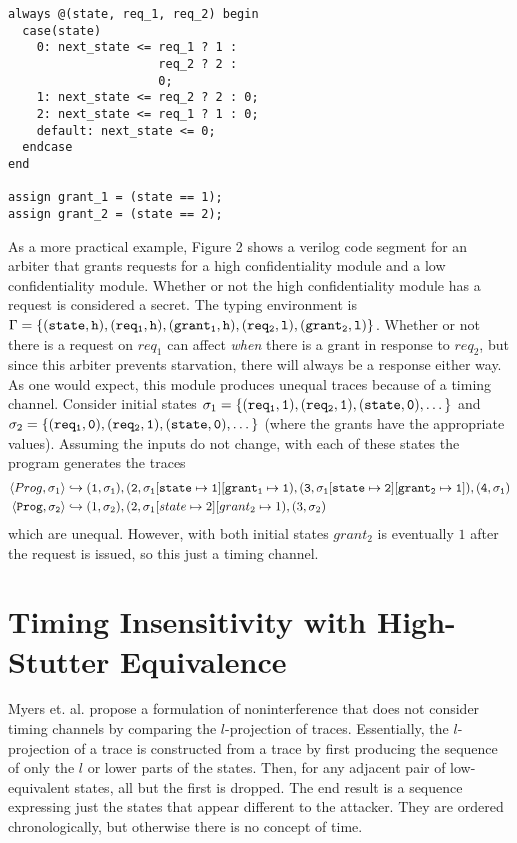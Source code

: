 \documentclass[paper=a4, fontsize=10pt]{scrartcl} %
\begin{document}
\begin{lstlisting}[frame=single,caption=An Arbiter in Verilog.]
always @(state, req_1, req_2) begin
  case(state)
    0: next_state <= req_1 ? 1 :
                     req_2 ? 2 :
                     0;
    1: next_state <= req_2 ? 2 : 0;
    2: next_state <= req_1 ? 1 : 0;
    default: next_state <= 0;
  endcase
end

assign grant_1 = (state == 1);
assign grant_2 = (state == 2);
\end{lstlisting}

As a more practical example, Figure 2 shows a verilog code segment for an 
arbiter that grants requests for a high confidentiality module and a low 
confidentiality module. Whether or not the high confidentiality module has a 
request is considered a secret.
The typing environment is
$\Gamma = \tt{\{(state, h), (req_1, h), (grant_1, h), (req_2, l), (grant_2, l)\}}$.
Whether or not there is a request on $req_1$ can affect \emph{when} there is a 
grant in response to $req_2$, but since this arbiter prevents starvation, there 
will always be a response either way. As one would expect, this module produces 
unequal traces because of a timing channel. Consider initial states
$\sigma_1 = \{(\tt{req_1}, 1), (\tt{req_2}, 1), (\tt{state}, 0), \dots\}$ and
$\sigma_2 = \{(\tt{req_1}, 0), (\tt{req_2}, 1), (\tt{state}, 0), \dots\}$ (where the grants 
have the appropriate values). Assuming the inputs 
do not change, with each of these states the program generates the traces
\begin{align*}
  \langle Prog, \sigma_1 \rangle & \hookrightarrow
  \tt
    (1, \sigma_1), (2, \sigma_1[state\mapsto1][grant_1\mapsto1),
    (3, \sigma_1[state\mapsto2][grant_2\mapsto1]), (4, \sigma_1) \\
    \tt
  \langle Prog, \sigma_2 \rangle & \hookrightarrow
    (1, \sigma_2), (2, \sigma_1[state\mapsto2][grant_2\mapsto1),
    (3, \sigma_2)
\end{align*}
which are unequal. However, with both initial states $grant_2$ is eventually
$1$ after the request is issued, so this just a timing channel.

\section{Timing Insensitivity with High-Stutter Equivalence}
Myers et. al. propose a formulation of noninterference that does not consider 
timing channels by comparing the $l$-projection of traces. Essentially, the 
$l$-projection of a trace is constructed from a trace by first producing the 
sequence of only the $l$ or lower parts of the states. Then, for any adjacent 
pair of low-equivalent states, all but the first is dropped. The end result is 
a sequence expressing just the states that appear different to the attacker. 
They are ordered chronologically, but otherwise there is no concept of time. 
\end{document}

